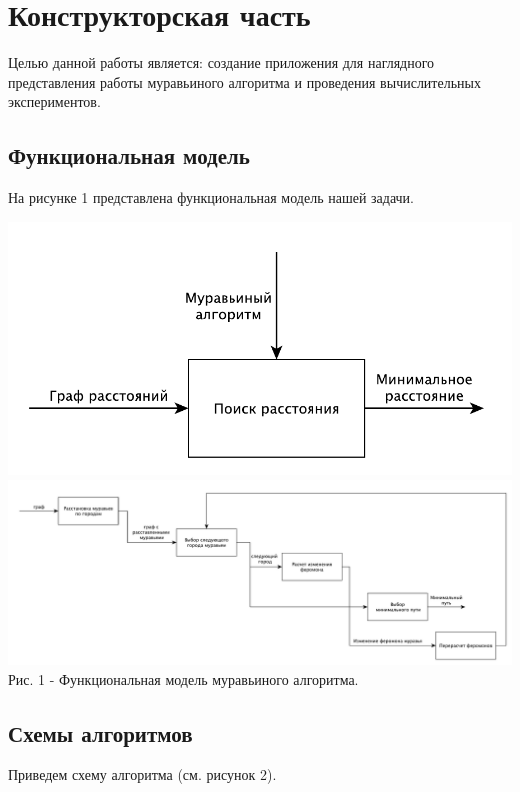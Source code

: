 \documentclass[a4paper,14pt]{article} %
\begin{document}
        	\newpage

	\section{Конструкторская часть}
	\hfill
	
	Целью данной работы является: создание приложения для наглядного представления работы муравьиного
алгоритма и проведения вычислительных экспериментов. 
	
		
	\subsection{Функциональная модель}
	
	На рисунке 1 представлена функциональная модель нашей задачи.  
	
	\begin{center}
		\includegraphics[scale = 0.8]{idef0}
		\includegraphics[scale = 0.4]{idef1} \\ Рис.  1 - Функциональная модель муравьиного алгоритма. 
	\end{center}
	        
        \subsection{Схемы алгоритмов}
        \hfill
        
         Приведем схему алгоритма (см. рисунок 2). 
         
\end{document}
